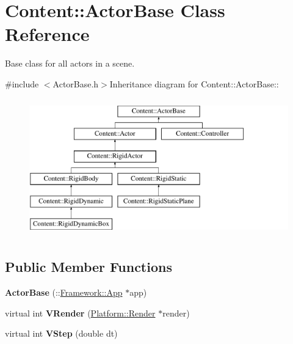 \hypertarget{classContent_1_1ActorBase}{
\section{Content::ActorBase Class Reference}
\label{classContent_1_1ActorBase}
}


Base class for all actors in a scene.  


{\ttfamily \#include $<$ActorBase.h$>$}Inheritance diagram for Content::ActorBase::\begin{figure}[H]
\begin{center}
\leavevmode
\includegraphics[height=6cm]{classContent_1_1ActorBase}
\end{center}
\end{figure}
\subsection*{Public Member Functions}
\begin{DoxyCompactItemize}
\item 
\hypertarget{classContent_1_1ActorBase_a5dc347f1fd34ee7cce25a10ca20ea0f2}{
{\bfseries ActorBase} (::\hyperlink{classFramework_1_1App}{Framework::App} $\ast$app)}
\label{classContent_1_1ActorBase_a5dc347f1fd34ee7cce25a10ca20ea0f2}

\item 
\hypertarget{classContent_1_1ActorBase_a2e4a283ed7d5c938f811deaa9e39a39b}{
virtual int {\bfseries VRender} (\hyperlink{classPlatform_1_1Render}{Platform::Render} $\ast$render)}
\label{classContent_1_1ActorBase_a2e4a283ed7d5c938f811deaa9e39a39b}

\item 
\hypertarget{classContent_1_1ActorBase_a663b525dd7815d35f7d132519a3ca88e}{
virtual int {\bfseries VStep} (double dt)}
\label{classContent_1_1ActorBase_a663b525dd7815d35f7d132519a3ca88e}

\end{DoxyCompactItemize}
